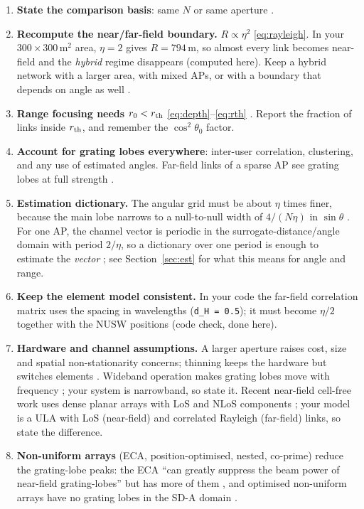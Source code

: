 \documentclass[11pt]{article}
\begin{document}
\begin{enumerate}[label=\textbf{R\arabic*.}]
  \item \textbf{State the comparison basis}: same $N$ \cite{wang2024sparsemimo,zhou2025sparse} or same aperture \cite{hussain2026thinning,kosasih2025mla}.
  \item \textbf{Recompute the near/far-field boundary.} $R\propto\eta^2$ \eqref{eq:rayleigh}. In your $300\times300$\,m$^2$ area, $\eta=2$ gives $R=794$\,m, so almost every link becomes near-field and the \emph{hybrid} regime disappears (computed here). Keep a hybrid network with a larger area, with mixed APs, or with a boundary that depends on angle as well \cite{lu2024tutorial,stutz2026boundaries}.
  \item \textbf{Range focusing needs $r_0<r_{\rm th}$} \eqref{eq:depth}--\eqref{eq:rth} \cite{zhou2025sparse,bjornson2021primer}. Report the fraction of links inside $r_{\rm th}$, and remember the $\cos^2\theta_0$ factor.
  \item \textbf{Account for grating lobes everywhere}: inter-user correlation, clustering, and any use of estimated angles. Far-field links of a sparse AP see grating lobes at full strength \cite{chen2025exploring}.
  \item \textbf{Estimation dictionary.} The angular grid must be about $\eta$ times finer, because the main lobe narrows to a null-to-null width of $4/(N\eta)$ in $\sin\theta$ \cite[Proposition~1]{zhou2025sparse}. For one AP, the channel vector is periodic in the surrogate-distance/angle domain with period $2/\eta$, so a dictionary over one period is enough to estimate the \emph{vector} \cite[Sec.~IV-A, eq.~(47)]{chen2024nearfield}; see Section~\ref{sec:est} for what this means for angle and range.
  \item \textbf{Keep the element model consistent.} In your code the far-field correlation matrix uses the spacing in wavelengths (\texttt{d\_H = 0.5}); it must become $\eta/2$ together with the NUSW positions (code check, done here).
  \item \textbf{Hardware and channel assumptions.} A larger aperture raises cost, size and spatial non-stationarity concerns; thinning keeps the hardware but switches elements \cite{hussain2026thinning}. Wideband operation makes grating lobes move with frequency \cite{li2024sparseisac}; your system is narrowband, so state it. Recent near-field cell-free work uses dense planar arrays with LoS and NLoS components \cite{wang2026combining}; your model is a ULA with LoS (near-field) and correlated Rayleigh (far-field) links, so state the difference.
  \item \textbf{Non-uniform arrays} (ECA, position-optimised, nested, co-prime) reduce the grating-lobe peaks: the ECA ``can greatly suppress the beam power of near-field grating-lobes'' but has more of them \cite[Abstract, Sec.~III]{zhou2025sparse}, and optimised non-uniform arrays have no grating lobes in the SD-A domain \cite[Sec.~IV-A]{chen2024nearfield}.
\end{enumerate}
\end{document}
